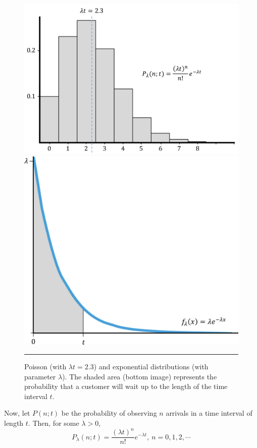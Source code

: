 \begin{figure}[!t]
\centering
\includegraphics[height=0.25\textheight]{Images/poisson.png}
\centering\includegraphics[height=0.25\textheight]{Images/exp.png}
\caption{\small Poisson (with $\lambda t=2.3$) and exponential distributions (with parameter $\lambda$). The shaded area (bottom image) represents the probability that a customer will wait up to the length of the time interval $t$.}\label{fig:dist1}\hrule
\end{figure}
Now, let $P(n;t)$ be the probability of observing $n$ arrivals in a time interval of length $t$.
Then, for some $\lambda>0$, 
$$ P_{\lambda}(n; t) = \frac{(\lambda t)^n}{n!} e^{-\lambda t}, \ n=0,1,2,\cdots$$
